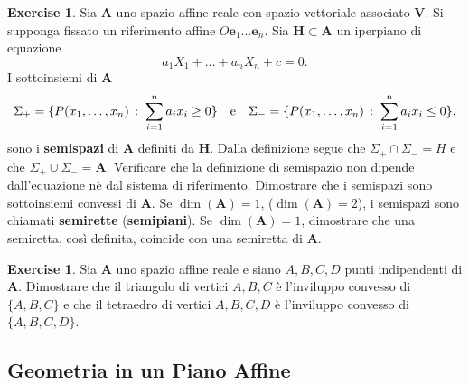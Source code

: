 \documentclass{article}
\theoremstyle{plain}
\theoremstyle{definition}
\newtheorem{xca}[exmp]{Exercise}
\theoremstyle{remark}
\begin{document}
\begin{bxthm}
\begin{xca}
    Sia $\mathbf{A}$ uno spazio affine reale con spazio vettoriale associato $\mathbf{V}$. 
    Si supponga fissato un riferimento affine $O\mathbf{e}_1\ldots\mathbf{e}_n$. Sia $\mathbf{H}\subset\mathbf{A}$ un iperpiano di equazione
    \[a_1X_1+\ldots+a_nX_n+c=0.\]
    I sottoinsiemi di $\mathbf{A}$
    \[\Sigma_+=\{P(x_1,\ldots,x_n)\,:\;\sum_{i=1}^{n}a_ix_i\geq0\}\quad\textup{e}\quad\Sigma_-=\{P(x_1,\ldots,x_n)\,:\;\sum_{i=1}^{n}a_ix_i\leq0\},\]
    sono i \textbf{semispazi} di $\mathbf{A}$ definiti da $\mathbf{H}$. 
    Dalla definizione segue che $\Sigma_+\cap\Sigma_-=H$ e che $\Sigma_+\cup\Sigma_-=\mathbf{A}$.
    Verificare che la definizione di semispazio non dipende dall'equazione nè dal sistema di riferimento. Dimostrare che i semispazi sono sottoinsiemi convessi di $\mathbf{A}$.
    Se $\dim(\mathbf{A})=1$, ($\dim(\mathbf{A})=2$), i semispazi sono chiamati \textbf{semirette} (\textbf{semipiani}). Se $\dim(\mathbf{A})=1$, dimostrare che una semiretta, così definita, coincide con una semiretta di $\mathbf{A}$.
\end{xca}
\end{bxthm}

\vspace{10pt}

\begin{bxthm}
\begin{xca}
    Sia $\mathbf{A}$ uno spazio affine reale e siano $A,B,C,D$ punti indipendenti di $\mathbf{A}$.
    Dimostrare che il triangolo di vertici $A,B,C$ è l'inviluppo convesso di $\{A,B,C\}$ e che il tetraedro di vertici $A,B,C,D$ è l'inviluppo convesso di $\{A,B,C,D\}$.
\end{xca}
\end{bxthm}

\newpage
\subsection{Geometria in un Piano Affine}
\vspace{20pt}
\end{document}
